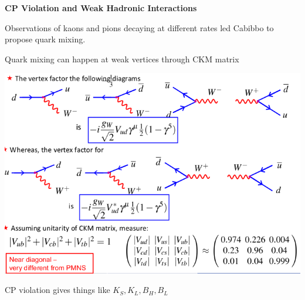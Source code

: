 \textbf{CP Violation and Weak Hadronic Interactions}

Observations of kaons and pions decaying at different rates led Cabibbo to propose quark mixing.

Quark mixing can happen at weak vertices through CKM matrix

\begin{center}
    \includegraphics[width=\linewidth]{images/ckm_vertices.png}
\end{center}

CP violation gives things like $K_S, K_L, B_H, B_L$

